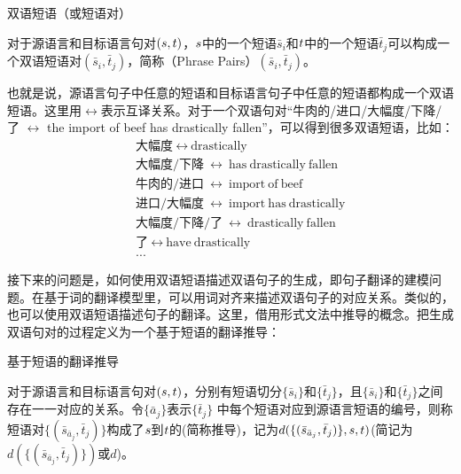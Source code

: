 \vspace{0.5em}
\begin{definition} 双语短语（或短语对）

{\small
对于源语言和目标语言句对$({s},{t})$，${s}$中的一个短语$\bar{s}_i$和${t}$中的一个短语$\bar{t}_j$可以构成一个双语短语对$(\bar{s}_i,\bar{t}_j)$，简称{\small{}}（Phrase Pairs）$(\bar{s}_i,\bar{t}_j)$。
}
\end{definition}

\parinterval 也就是说，源语言句子中任意的短语和目标语言句子中任意的短语都构成一个双语短语。这里用$\leftrightarrow$表示互译关系。对于一个双语句对“牛肉的/进口/大幅度/下降/了 $\leftrightarrow$ the import of beef has drastically fallen”，可以得到很多双语短语，比如：
\begin{eqnarray}
&&\text{大幅度}\ \leftrightarrow\ \textrm{drastically} \nonumber \\
&&\text{大幅度}/\text{下降}\ \leftrightarrow\ \textrm{has}\ \textrm{drastically}\ \textrm{fallen} \nonumber \\
&&\text{牛肉的}/\text{进口}\ \leftrightarrow\ \textrm{import}\ \textrm{of}\ \textrm{beef} \nonumber \\
&&\text{进口}/\text{大幅度}\ \leftrightarrow\ \textrm{import}\ \textrm{has}\ \textrm{drastically} \nonumber \\
&&\text{大幅度}/\text{下降}/\text{了}\ \leftrightarrow\ \textrm{drastically}\ \textrm{fallen} \nonumber \\
&&\text{了}\ \leftrightarrow\ \textrm{have}\ \textrm{drastically} \nonumber \\
&&... \nonumber
\end{eqnarray}

\parinterval 接下来的问题是，如何使用双语短语描述双语句子的生成，即句子翻译的建模问题。在基于词的翻译模型里，可以用词对齐来描述双语句子的对应关系。类似的，也可以使用双语短语描述句子的翻译。这里，借用形式文法中推导的概念。把生成双语句对的过程定义为一个基于短语的翻译推导：

\vspace{0.5em}
\begin{definition} 基于短语的翻译推导

{\small
对于源语言和目标语言句对$({s},{t})$，分别有短语切分$\{\bar{s}_i\}$和$\{\bar{t}_j\}$，且$\{\bar{s}_i\}$和$\{\bar{t}_j\}$之间存在一一对应的关系。令$\{\bar{a}_j\}$表示$\{\bar{t}_j\}$ 中每个短语对应到源语言短语的编号，则称短语对$\{(\bar{s}_{\bar{a}_j},\bar{t}_j)\}$构成了${s}$到${t}$的{\small{}}(简称推导)，记为$d(\{(\bar{s}_{\bar{a}_j},\bar{t}_j)\},{s},{t})$(简记为$d(\{(\bar{s}_{\bar{a}_j},\bar{t}_j)\})$或$d$)。
}
\end{definition}

